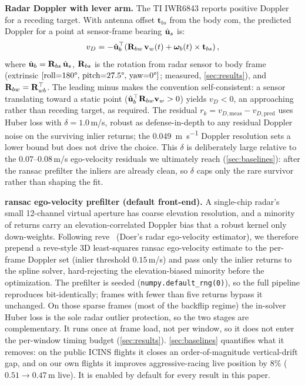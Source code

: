 \textbf{Radar Doppler with lever arm.}
The TI IWR6843 reports positive Doppler for a receding target.
With antenna offset $\mathbf{t}_{bs}$ from the body \ac{com}, the
predicted Doppler for a point at sensor-frame bearing $\hat{\mathbf{u}}_s$ is:
\begin{equation}
  v_D = -\hat{\mathbf{u}}_b^{\top}\!\left(
    \mathbf{R}_{bw}\,\mathbf{v}_w(t) + \boldsymbol{\omega}_b(t) \times \mathbf{t}_{bs}
  \right),
  \label{eq:doppler}
\end{equation}
where $\hat{\mathbf{u}}_b = \mathbf{R}_{bs}\,\hat{\mathbf{u}}_s$, $\mathbf{R}_{bs}$ is the rotation from
radar sensor to body frame (extrinsic $[\text{roll}{=}180\degree,\,
\text{pitch}{=}27.5\degree,\,\text{yaw}{=}0\degree]$; measured,
\autoref{sec:results}), and
$\mathbf{R}_{bw} = \mathbf{R}_{wb}^{\top}$.  The leading minus makes the convention
self-consistent: a sensor translating toward a static point
($\hat{\mathbf{u}}_b^{\top}\mathbf{R}_{bw}\mathbf{v}_w > 0$) yields $v_D < 0$, an approaching rather
than receding target, as required.  The residual
$r_k = v_{D,\text{meas}} - v_{D,\text{pred}}$ uses Huber
loss with $\delta = 1.0$\,m/s, robust as defense-in-depth to any
residual Doppler noise on the surviving inlier returns; the
\SI{0.049}{\metre\per\second} Doppler resolution sets a lower bound but
does not drive the choice.  This $\delta$ is deliberately large relative to
the $0.07$--$0.08$\,m/s ego-velocity residuals we ultimately reach
(\autoref{sec:baselines}): after the \ac{ransac} prefilter the inliers are
already clean, so $\delta$ caps only the rare survivor rather than shaping
the fit.

\textbf{\ac{ransac} ego-velocity prefilter (default front-end).}
A single-chip radar's small 12-channel virtual aperture has
coarse elevation resolution, and a minority of returns carry an elevation-correlated
Doppler bias that a robust kernel only down-weights.  Following
\mbox{reve}~\cite{doer2020ekf} (Doer's radar ego-velocity estimator), we
therefore prepend a \mbox{reve}-style 3D
least-squares \ac{ransac} ego-velocity estimate to the per-frame Doppler set
(inlier threshold $0.15$\,m/s) and pass only the inlier returns to the
spline solver, hard-rejecting the elevation-biased minority before the
optimization.  The prefilter is seeded
(\texttt{numpy.default\_rng(0)}), so the full pipeline reproduces
bit-identically; frames with fewer than five returns bypass it
unchanged.  On those sparse frames (most of the backflip regime) the
in-solver Huber loss is the sole radar outlier protection, so the two
stages are complementary.  It runs once at frame load, not per window, so
it does not enter the per-window timing budget (\autoref{sec:results}).
\autoref{sec:baselines} quantifies what it removes: on the public
ICINS flights it closes an order-of-magnitude vertical-drift gap, and on
our own flights it improves aggressive-racing live position by $8\%$ ($0.51\to0.47$\,m
live).  It is enabled by default for every result in this paper.

